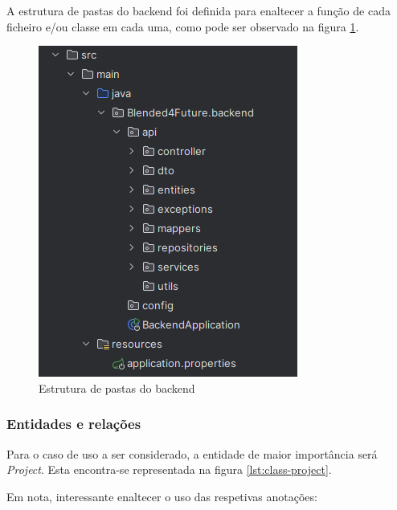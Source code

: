 A estrutura de pastas do backend foi definida para enaltecer a função de cada ficheiro e/ou classe em cada uma, como pode ser observado na figura \ref{fig:folder-struct-backend}.

\begin{figure}[h!tbp]
    \centering
    \includegraphics[width=0.5\linewidth]{capitulos/cap4-implementacao/assets/fold-struct-backend.png}
    \caption{Estrutura de pastas do backend}
    \label{fig:folder-struct-backend}
\end{figure}

\subsubsection{Entidades e relações}

Para o caso de uso a ser considerado, a entidade de maior importância será \textit{Project}. Esta encontra-se representada na figura \ref{lst:class-project}.

Em nota, interessante enaltecer o uso das respetivas anotações:

